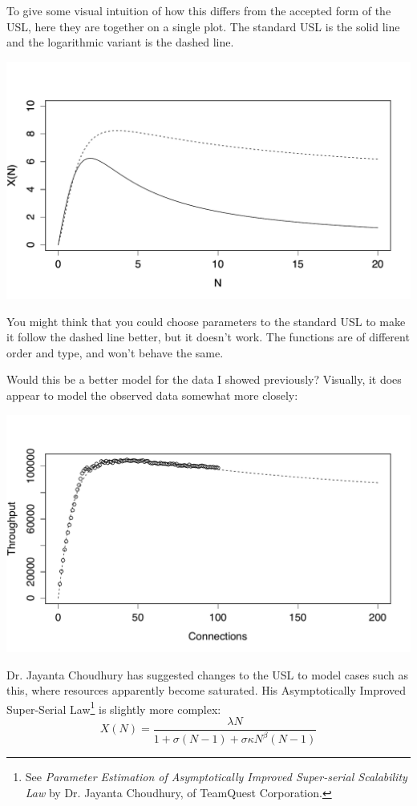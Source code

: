 \documentclass{vivid_layout}
\begin{document}
To give some visual intuition of how this differs from the accepted form of the
USL, here they are together on a single plot. The standard USL is the solid line
and the logarithmic variant is the dashed line.
\begin{center}
\includegraphics[width=.85\linewidth]{scalability/logscale}
\end{center}

You might think that you could choose parameters to the standard USL to make it
follow the dashed line better, but it doesn't work. The functions are of
different order and type, and won't behave the same.

Would this be a better model for the data I showed previously? Visually, it does
appear to model the observed data somewhat more closely:
\begin{center}
\includegraphics[width=.85\linewidth]{scalability/logscale-2}
\end{center}

Dr. Jayanta Choudhury has suggested changes to the USL to model cases such as this,
where resources apparently become saturated.  His 
Asymptotically Improved Super-Serial Law\footnote{See {\itshape Parameter
Estimation of Asymptotically Improved Super-serial Scalability Law} by Dr.
Jayanta Choudhury, of TeamQuest Corporation.} is slightly more complex:
\begin{equation}
X(N) = \frac{\lambda N}{1 + \sigma(N-1) + \sigma \kappa N^\beta (N-1)}
\label{aissl}
\end{equation}
\end{document}
